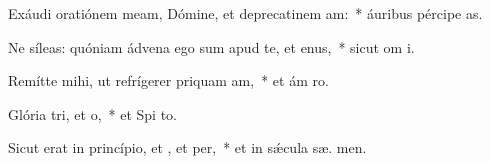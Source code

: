 \item Exáudi oratiónem meam, Dómine, et deprecatinem am:~* áuribus pércipe  as.
\item Ne síleas: quóniam ádvena ego sum apud te, et enus,~* sicut om  i.
\item Remítte mihi, ut refrígerer priquam am,~* et ám  ro.
\item Glória tri, et o,~* et Spi to.
\item Sicut erat in princípio, et , et per,~* et in sǽcula sæ. men.
